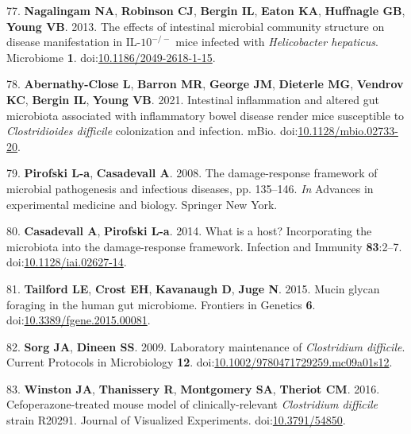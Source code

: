 \documentclass[
  12pt,
]{article}
\newenvironment{cslreferences}%
  {}%
  {\par}
\begin{document}
\begin{cslreferences}
\leavevmode\hypertarget{ref-Nagalingam2013}{}%
77. \textbf{Nagalingam NA}, \textbf{Robinson CJ}, \textbf{Bergin IL},
\textbf{Eaton KA}, \textbf{Huffnagle GB}, \textbf{Young VB}. 2013. The
effects of intestinal microbial community structure on disease
manifestation in IL-\(10^{-/-}\) mice infected with \emph{Helicobacter
hepaticus}. Microbiome \textbf{1}.
doi:\href{https://doi.org/10.1186/2049-2618-1-15}{10.1186/2049-2618-1-15}.

\leavevmode\hypertarget{ref-AbernathyClose2021}{}%
78. \textbf{Abernathy-Close L}, \textbf{Barron MR}, \textbf{George JM},
\textbf{Dieterle MG}, \textbf{Vendrov KC}, \textbf{Bergin IL},
\textbf{Young VB}. 2021. Intestinal inflammation and altered gut
microbiota associated with inflammatory bowel disease render mice
susceptible to \emph{Clostridioides difficile} colonization and
infection. mBio.
doi:\href{https://doi.org/10.1128/mbio.02733-20}{10.1128/mbio.02733-20}.

\leavevmode\hypertarget{ref-Pirofski2008}{}%
79. \textbf{Pirofski L-a}, \textbf{Casadevall A}. 2008. The
damage-response framework of microbial pathogenesis and infectious
diseases, pp. 135--146. \emph{In} Advances in experimental medicine and
biology. Springer New York.

\leavevmode\hypertarget{ref-Casadevall2014}{}%
80. \textbf{Casadevall A}, \textbf{Pirofski L-a}. 2014. What is a host?
Incorporating the microbiota into the damage-response framework.
Infection and Immunity \textbf{83}:2--7.
doi:\href{https://doi.org/10.1128/iai.02627-14}{10.1128/iai.02627-14}.

\leavevmode\hypertarget{ref-Tailford2015}{}%
81. \textbf{Tailford LE}, \textbf{Crost EH}, \textbf{Kavanaugh D},
\textbf{Juge N}. 2015. Mucin glycan foraging in the human gut
microbiome. Frontiers in Genetics \textbf{6}.
doi:\href{https://doi.org/10.3389/fgene.2015.00081}{10.3389/fgene.2015.00081}.

\leavevmode\hypertarget{ref-Sorg2009}{}%
82. \textbf{Sorg JA}, \textbf{Dineen SS}. 2009. Laboratory maintenance
of \emph{Clostridium difficile}. Current Protocols in Microbiology
\textbf{12}.
doi:\href{https://doi.org/10.1002/9780471729259.mc09a01s12}{10.1002/9780471729259.mc09a01s12}.

\leavevmode\hypertarget{ref-Winston2016}{}%
83. \textbf{Winston JA}, \textbf{Thanissery R}, \textbf{Montgomery SA},
\textbf{Theriot CM}. 2016. Cefoperazone-treated mouse model of
clinically-relevant \emph{Clostridium difficile} strain R20291. Journal
of Visualized Experiments.
doi:\href{https://doi.org/10.3791/54850}{10.3791/54850}.


\end{cslreferences}
\end{document}

